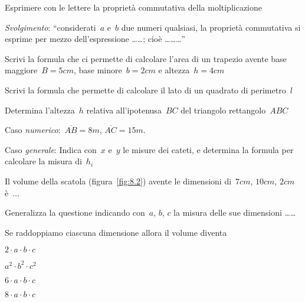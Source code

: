 \begin{esercizio}
\label{ese:8.6}
Esprimere con le lettere la proprietà commutativa della moltiplicazione

\emph{Svolgimento}: ``considerati~\(a\) e~\(b\) due numeri qualsiasi, la proprietà 
commutativa si esprime per mezzo dell'espressione \ldots\ldots; 
cioè \ldots\ldots\ldots''
\end{esercizio}

\begin{multicols}{2}
\begin{esercizio}
\label{ese:8.7}
Scrivi la formula che ci permette di calcolare l'area di un trapezio avente 
base maggiore~\(B=5\unit{cm}\), base minore~\(b=2\unit{cm}\) e 
altezza~\(h=4\unit{cm}\)
\end{esercizio}

\begin{esercizio}
\label{ese:8.8}
Scrivi la formula che permette di calcolare il lato di un quadrato di 
perimetro~\(l\)
\end{esercizio}

\begin{esercizio}
\label{ese:8.9}
Determina l'altezza~\(h\) relativa all'ipotenusa~\(BC\) del triangolo 
rettangolo~\(ABC\)

Caso \emph{numerico}:~\(\overline{AB}=8\unit{m}\), \(\overline{AC}=15\unit{m}.\)

Caso \emph{generale}: Indica con~\(x\) e~\(y\) le misure dei cateti, e determina 
la formula per calcolare la misura di~\(h_i\)
\end{esercizio}

\begin{esercizio}
\label{ese:8.10}
Il volume della scatola (figura~\ref{fig:8.2}) avente le dimensioni 
di~\(7\unit{cm}\), \(10\unit{cm}\), \(2\unit{cm}\) è~\(\ldots\)

Generalizza la questione indicando con~\(a\), \(b\), \(c\) la misura delle sue 
dimensioni \ldots\ldots

Se raddoppiamo ciascuna dimensione allora il volume diventa
 \begin{enumeratea}
 \item \(2\cdot a\cdot b\cdot c\)
 \item \(a^{2}\cdot b^{2}\cdot c^{2}\)
 \item \(6\cdot a\cdot b\cdot c\)
 \item \(8\cdot a\cdot b\cdot c\)
 \end{enumeratea}
\end{esercizio}


\end{multicols}
